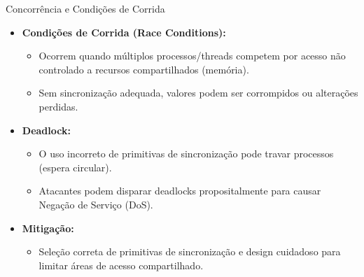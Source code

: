 \begin{frame}{Concorrência e Condições de Corrida}
    \begin{itemize}
        \item \textbf{Condições de Corrida (Race Conditions):}
              \begin{itemize}
                  \item Ocorrem quando múltiplos processos/threads competem por acesso não controlado a recursos compartilhados (memória).
                  \item Sem sincronização adequada, valores podem ser corrompidos ou alterações perdidas.
              \end{itemize}

        \item \textbf{Deadlock:}
              \begin{itemize}
                  \item O uso incorreto de primitivas de sincronização pode travar processos (espera circular).
                  \item Atacantes podem disparar deadlocks propositalmente para causar Negação de Serviço (DoS).
              \end{itemize}

        \item \textbf{Mitigação:}
              \begin{itemize}
                  \item Seleção correta de primitivas de sincronização e design cuidadoso para limitar áreas de acesso compartilhado.
              \end{itemize}
    \end{itemize}
\end{frame}

